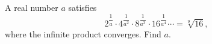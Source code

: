 A real number $a$ satisfies
\[
2^{\dfrac{1}{a}}\cdot4^{\dfrac{1}{a^2}}\cdot8^{\dfrac{1}{a^3}}\cdot16^{\dfrac{1}{a^4}}\cdots=\sqrt[9]{16},
\]
where the infinite product converges. Find $a$.
